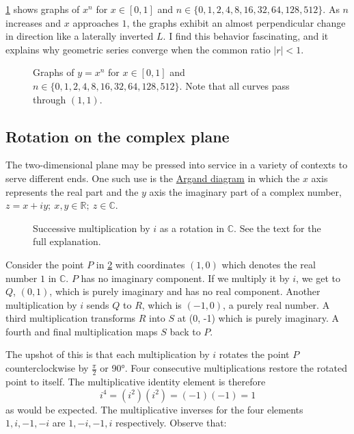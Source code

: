 \documentclass[
  a4paper,
]{article}
\begin{document}
\cref{fig:x-to-n} shows graphs of \(x^n\) for \(x \in [0, 1]\) and
\(n \in\{0, 1, 2, 4, 8, 16, 32, 64, 128, 512\}\). As \(n\) increases and
\(x\) approaches \(1\), the graphs exhibit an almost perpendicular
change in direction like a laterally inverted \(L\). I find this
behavior fascinating, and it explains why geometric series converge when
the common ratio \(\lvert r \rvert < 1\).

\begin{figure}
\centering

\caption{Graphs of \(y = x^n\) for \(x \in [0, 1]\) and
\(n \in \{0, 1, 2, 4, 8, 16, 32, 64, 128, 512\}\). Note that all curves
pass through \((1, 1)\).}\label{fig:x-to-n}
\end{figure}

\subsection{Rotation on the complex
plane}\label{rotation-on-the-complex-plane}

The two-dimensional plane may be pressed into service in a variety of
contexts to serve different ends. One such use is the
\href{https://mathworld.wolfram.com/ArgandDiagram.html}{Argand diagram}
in which the \(x\) axis represents the real part and the \(y\) axis the
imaginary part of a complex number,
\(z = x + iy;\:x, y \in \mathbb{R};\: z \in \mathbb{C}\).

\begin{figure}
\centering

\caption{Successive multiplication by \(i\) as a rotation in
\(\mathbb{C}\). See the text for the full explanation.}\label{fig:C4}
\end{figure}

Consider the point \(P\) in \cref{fig:C4} with coordinates \((1, 0)\)
which denotes the real number \(1\) in \(\mathbb{C}\). \(P\) has no
imaginary component. If we multiply it by \(i\), we get to \(Q\),
\((0, 1)\), which is purely imaginary and has no real component. Another
multiplication by \(i\) sends \(Q\) to \(R\), which is \((-1, 0)\), a
purely real number. A third multiplication transforms \(R\) into \(S\)
at (0, -1) which is purely imaginary. A fourth and final multiplication
maps \(S\) back to \(P\).

The upshot of this is that each multiplication by \(i\) rotates the
point \(P\) counterclockwise by \(\frac{\pi}{2}\) or 90°. Four
consecutive multiplications restore the rotated point to itself. The
multiplicative identity element is therefore \[
i^4 = (i^2)(i^2) = (-1)(-1) = 1
\] as would be expected. The multiplicative inverses for the four
elements \(1, i, -1, -i\) are \(1, -i, -1, i\) respectively. Observe
that:
\end{document}
